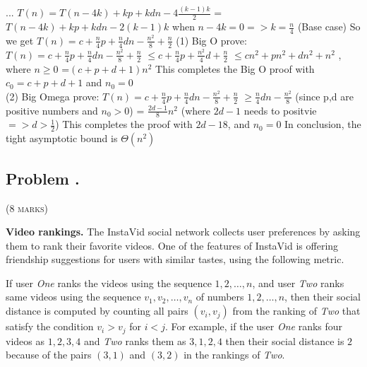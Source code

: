 \documentclass[12pt]{article}
\newcounter{ProblemNum}
\renewcommand{\theProblemNum}{\arabic{ProblemNum}}
\newcommand*{\anyproblem}[1]{\newpage\subsection*{#1}}
\newcommand*{\problem}[1]{\stepcounter{ProblemNum} %
\anyproblem{Problem \theProblemNum. \; #1}}
\begin{document}
\qquad \qquad \qquad \qquad...\vskip5pt
$T(n) = T(n-4k) + kp + kdn - 4\frac{(k-1)k}{2}$\vskip5pt
\qquad = $T(n-4k) + kp + kdn - 2(k-1)k$\vskip5pt
when $n-4k = 0 => k = \frac{n}{4}$ (Base case)\vskip5pt
So we get $T(n) = c + \frac{n}{4}p + \frac{n}{4}dn - \frac{n^2}{8} + \frac{n}{2} $\vskip5pt
(1) Big O prove:\vskip5pt
$T(n) = c + \frac{n}{4}p + \frac{n}{4}dn - \frac{n^2}{8} + \frac{n}{2} $\vskip5pt
\qquad $\le c + \frac{n}{4}p + \frac{n^2}{4}d + \frac{n}{2}$ \vskip5pt
\qquad $\le cn^2 + pn^2 + dn^2 + n^2 $  , where $ n\ge 0$\vskip5pt
\qquad =$(c+p+d+1)n^2$\vskip5pt
This completes the Big O proof with $c_0 = c+p+d+1 $ and $n_0 = 0$\\[2ex]
(2) Big Omega prove:\vskip5pt
$T(n) = c + \frac{n}{4}p + \frac{n}{4}dn - \frac{n^2}{8} + \frac{n}{2} $\vskip5pt
\qquad $\ge \frac{n}{4}dn - \frac{n^2}{8}$ (since p,d are positive numbers and $n_0 > 0$)\vskip5pt
\qquad = $\frac{2d-1}{8}n^2$ (where $2d - 1$ needs to positvie $=> d > \frac{1}{2}$)\vskip5pt
This completes the proof with ${2d-1}{8}$, and $n_0 = 0$\vskip5pt
In conclusion, the tight asymptotic bound is $\Theta(n^2)$

\problem{}
\textsc{(8 marks)} 

\textbf{Video rankings.} The InstaVid social network collects user preferences by asking them to rank their favorite videos. One of the features of InstaVid is offering friendship suggestions for users with similar tastes, using the following metric.

If user \emph{One} ranks the videos using the sequence $1,2,\dots,n$, and user \emph{Two} ranks same videos using the sequence $v_1,v_2,\dots,v_n$ of numbers $1,2,\dots,n$, then their social distance is computed by counting all pairs $(v_i,v_j)$ from the ranking of \emph{Two} that satisfy the condition $v_i>v_j$  for $i<j$. For example, if the user \emph{One} ranks four videos as $1,2,3,4$ and \emph{Two} ranks them as $3,1,2,4$ then 
their social distance is $2$ because of the pairs $(3,1)$ and $(3,2)$ in the rankings of \emph{Two}.
\end{document}
